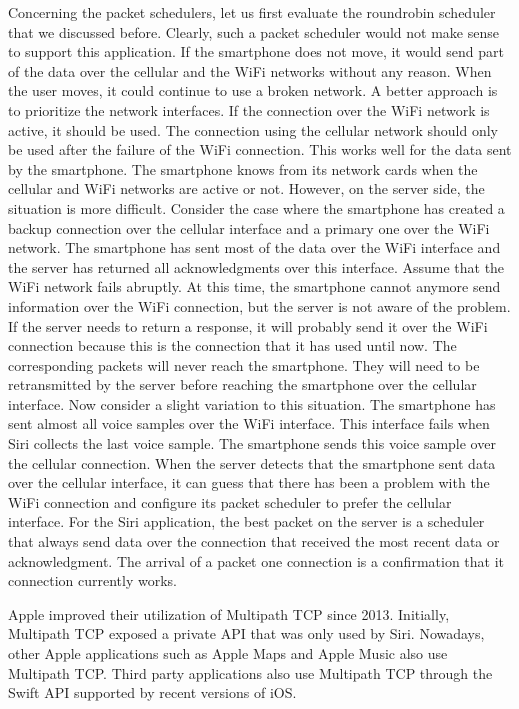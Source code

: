 \documentclass[letterpaper,10pt,english]{sphinxmanual}
\begin{document}
\sphinxAtStartPar
Concerning the packet schedulers, let us first evaluate the round\sphinxhyphen{}robin scheduler that we discussed before. Clearly, such a packet scheduler would not make sense to support this application. If the smartphone does not move, it would send part of the data over the cellular and the Wi\sphinxhyphen{}Fi networks without any reason. When the user moves, it could continue to use a broken network. A better approach is to prioritize the network interfaces. If the connection over the Wi\sphinxhyphen{}Fi network is active, it should be used. The connection using the cellular network should only be used after the failure of the Wi\sphinxhyphen{}Fi connection. This works well for the data sent by the smartphone. The smartphone knows from its network cards when the cellular and Wi\sphinxhyphen{}Fi networks are active or not. However, on the server side, the situation is more difficult. Consider the case where the smartphone has created a backup connection over the cellular interface and a primary one over the Wi\sphinxhyphen{}Fi network. The smartphone has sent most of the data over the Wi\sphinxhyphen{}Fi interface and the server has returned all acknowledgments over this interface. Assume that the Wi\sphinxhyphen{}Fi network fails abruptly. At this time, the smartphone cannot anymore send information over the Wi\sphinxhyphen{}Fi connection, but the server is not aware of the problem. If the server needs to return a response, it will probably send it over the Wi\sphinxhyphen{}Fi connection because this is the connection that it has used until now. The corresponding packets will never reach the smartphone. They will need to be retransmitted by the server before reaching the smartphone over the cellular interface. Now consider a slight variation to this situation. The smartphone has sent almost all voice samples over the Wi\sphinxhyphen{}Fi interface. This interface fails when Siri collects the last voice sample. The smartphone sends this voice sample over the cellular connection. When the server detects that the smartphone sent data over the cellular interface, it can guess that there has been a problem with the Wi\sphinxhyphen{}Fi connection and configure its packet scheduler to prefer the cellular interface. For the Siri application, the best packet on the server is a scheduler that always send data over the connection that received the most recent data or acknowledgment. The arrival of a packet one connection is a confirmation that it connection currently works.

\sphinxAtStartPar
Apple improved their utilization of Multipath TCP since 2013. Initially, Multipath TCP exposed a private API that was only used by Siri. Nowadays, other Apple applications such as Apple Maps and Apple Music also use Multipath TCP. Third party applications also use Multipath TCP through the Swift API supported by recent versions of iOS.
\end{document}
